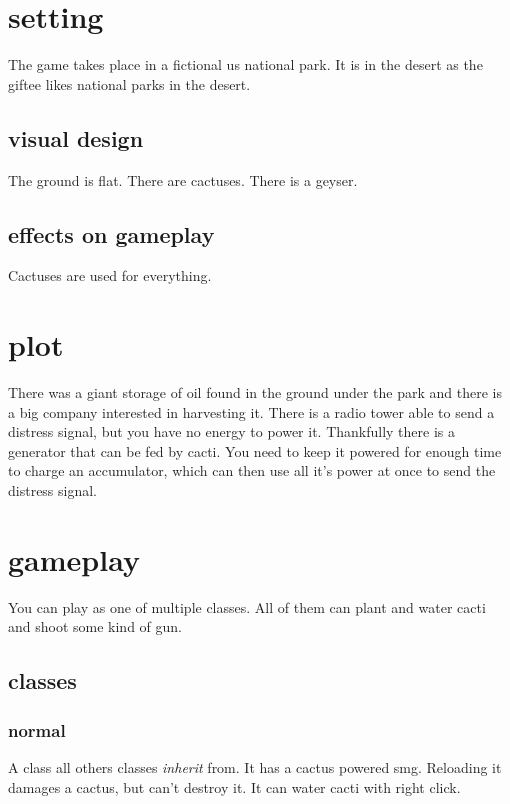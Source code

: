 \documentclass{article}
\begin{document}
\section{setting}

The game takes place in a fictional us national park.
It is in the desert as the giftee likes national parks in the desert.

\subsection{visual design}

The ground is flat. There are cactuses. There is a geyser.

\subsection{effects on gameplay}

Cactuses are used for everything.

\section{plot}

There was a giant storage of oil found in the ground under the park and
there is a big company interested in harvesting it. There is a radio tower
able to send a distress signal, but you have no energy to power it.
Thankfully there is a generator that can be fed by cacti. You need
to keep it powered for enough time to charge an accumulator, which can then
use all it's power at once to send the distress signal.

\section{gameplay}

You can play as one of multiple classes. All of them can plant and water cacti
and shoot some kind of gun.

\subsection{classes}

\subsubsection{normal}

A class all others classes \textit{inherit} from.
It has a cactus powered smg. Reloading it damages a cactus, but can't destroy it.
It can water cacti with right click.
\end{document}
